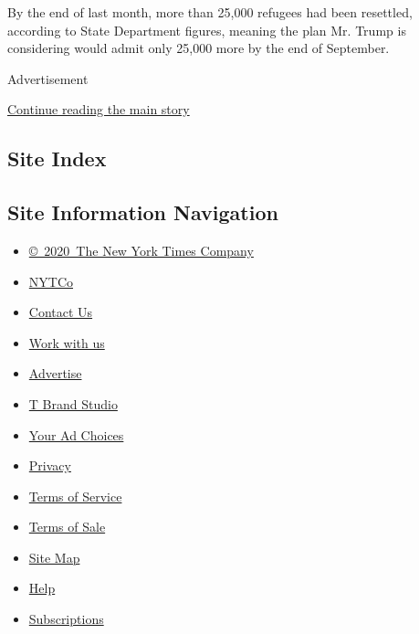 By the end of last month, more than 25,000 refugees had been resettled,
according to State Department figures, meaning the plan Mr. Trump is
considering would admit only 25,000 more by the end of September.

Advertisement

\protect\hyperlink{after-bottom}{Continue reading the main story}

\hypertarget{site-index}{%
\subsection{Site Index}\label{site-index}}

\hypertarget{site-information-navigation}{%
\subsection{Site Information
Navigation}\label{site-information-navigation}}

\begin{itemize}
\tightlist
\item
  \href{https://help.nytimes.com/hc/en-us/articles/115014792127-Copyright-notice}{©~2020~The
  New York Times Company}
\end{itemize}

\begin{itemize}
\tightlist
\item
  \href{https://www.nytco.com/}{NYTCo}
\item
  \href{https://help.nytimes.com/hc/en-us/articles/115015385887-Contact-Us}{Contact
  Us}
\item
  \href{https://www.nytco.com/careers/}{Work with us}
\item
  \href{https://nytmediakit.com/}{Advertise}
\item
  \href{http://www.tbrandstudio.com/}{T Brand Studio}
\item
  \href{https://www.nytimes.com/privacy/cookie-policy\#how-do-i-manage-trackers}{Your
  Ad Choices}
\item
  \href{https://www.nytimes.com/privacy}{Privacy}
\item
  \href{https://help.nytimes.com/hc/en-us/articles/115014893428-Terms-of-service}{Terms
  of Service}
\item
  \href{https://help.nytimes.com/hc/en-us/articles/115014893968-Terms-of-sale}{Terms
  of Sale}
\item
  \href{https://spiderbites.nytimes.com}{Site Map}
\item
  \href{https://help.nytimes.com/hc/en-us}{Help}
\item
  \href{https://www.nytimes.com/subscription?campaignId=37WXW}{Subscriptions}
\end{itemize}
